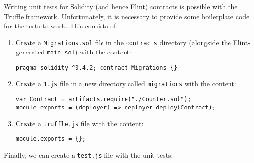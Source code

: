 Writing unit tests for Solidity (and hence Flint) contracts is possible with the Truffle framework. Unfortunately, it is necessary to provide some boilerplate code for the tests to work. This consists of:

\begin{enumerate}
	\item Create a \texttt{Migrations.sol} file in the \texttt{contracts} directory (alongside the Flint-generated \texttt{main.sol}) with the content:\\
\begin{verbatim}
pragma solidity ^0.4.2; contract Migrations {}
\end{verbatim}
	\item Create a \texttt{1.js} file in a new directory called \texttt{migrations} with the content:\\
\begin{verbatim}
var Contract = artifacts.require("./Counter.sol");
module.exports = (deployer) => deployer.deploy(Contract);
\end{verbatim}
	\item Create a \texttt{truffle.js} file with the content:\\
\begin{verbatim}
module.exports = {};
\end{verbatim}
\end{enumerate}

Finally, we can create a \texttt{test.js} file with the unit tests:

